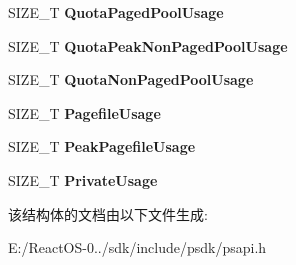 \begin{DoxyCompactItemize}
S\+I\+Z\+E\+\_\+T {\bfseries Quota\+Paged\+Pool\+Usage}
\item 
\mbox{\label{struct___p_r_o_c_e_s_s___m_e_m_o_r_y___c_o_u_n_t_e_r_s___e_x_a6bdc582a5453e092df3cef5aaa5b7561}} 
S\+I\+Z\+E\+\_\+T {\bfseries Quota\+Peak\+Non\+Paged\+Pool\+Usage}
\item 
\mbox{\label{struct___p_r_o_c_e_s_s___m_e_m_o_r_y___c_o_u_n_t_e_r_s___e_x_a2790edad1984d13cea99fc879b4893fa}} 
S\+I\+Z\+E\+\_\+T {\bfseries Quota\+Non\+Paged\+Pool\+Usage}
\item 
\mbox{\label{struct___p_r_o_c_e_s_s___m_e_m_o_r_y___c_o_u_n_t_e_r_s___e_x_a01d0896fe0ea57e1506710cb98bb535c}} 
S\+I\+Z\+E\+\_\+T {\bfseries Pagefile\+Usage}
\item 
\mbox{\label{struct___p_r_o_c_e_s_s___m_e_m_o_r_y___c_o_u_n_t_e_r_s___e_x_a0f17140d6fad8219c81353e0fad7e82e}} 
S\+I\+Z\+E\+\_\+T {\bfseries Peak\+Pagefile\+Usage}
\item 
\mbox{\label{struct___p_r_o_c_e_s_s___m_e_m_o_r_y___c_o_u_n_t_e_r_s___e_x_aae968608fa5ef0b180801d8540e48548}} 
S\+I\+Z\+E\+\_\+T {\bfseries Private\+Usage}
\end{DoxyCompactItemize}


该结构体的文档由以下文件生成\+:\begin{DoxyCompactItemize}
\item 
E\+:/\+React\+O\+S-\/0../sdk/include/psdk/psapi.\+h\end{DoxyCompactItemize}
